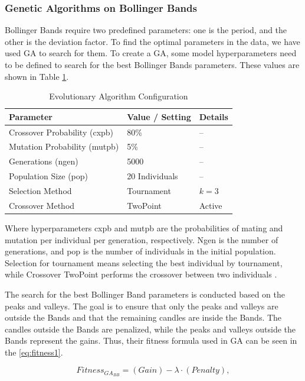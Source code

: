 \documentclass{ieeeaccess}
\begin{document}
\subsubsection{Genetic Algorithms on Bollinger Bands}
\label{sec:GA_BB}
Bollinger Bands require two predefined parameters: one is the period, and the other is the deviation factor. To find the optimal parameters in the data, we have used GA to search for them. To create a GA, some model hyperparameters need to be defined to search for the best Bollinger Bands parameters. These values are shown in Table \ref{tab:ga_settings_model}. 

\begin{table}
\caption{Evolutionary Algorithm Configuration}
\label{tab:ga_settings_model}
\setlength{\tabcolsep}{3pt}
\begin{tabular}{|p{110pt}|p{70pt}|p{40pt}|}
\hline
Parameter& 
Value / Setting& 
Details \\ 
\hline
Crossover Probability (cxpb) & 80\% & -- \\
Mutation Probability (mutpb) & 5\% & -- \\
Generations (ngen) & 5000 & -- \\
Population Size (pop) & 20 Individuals & -- \\
Selection Method & Tournament & $k = 3$ \\
Crossover Method & TwoPoint & Active \\ 
\hline
\end{tabular}
\end{table}

Where hyperparameters cxpb and mutpb are the probabilities of mating and mutation per individual per generation, respectively. Ngen is the number of generations, and pop is the number of individuals in the initial population. Selection for tournament means selecting the best individual by tournament, while Crossover TwoPoint performs the crossover between two individuals \cite{dedeap}.

The search for the best Bollinger Band parameters is conducted based on the peaks and valleys. The goal is to ensure that only the peaks and valleys are outside the Bands and that the remaining candles are inside the Bands. The candles outside the Bands are penalized, while the peaks and valleys outside the Bands represent the gains. Thus, their fitness formula used in GA can be seen in the \eqref{eq:fitness1}.

\begin{equation}
\mathit{Fitness_{GA_{BB}}} = ({Gain}) - \lambda \cdot (\mathit{Penalty}),
\label{eq:fitness1}
\end{equation}
\end{document}

